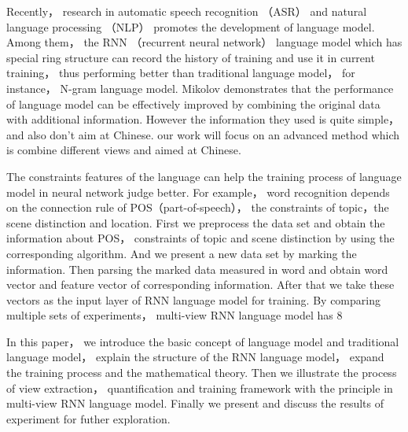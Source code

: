 \begin{englishabstract}
Recently， research in automatic speech recognition （ASR） and natural language processing （NLP） promotes the development of language model. Among them， the RNN （recurrent neural network） language model which has special ring structure can record the history of training and use it in current training， thus performing better than traditional language model， for instance， N-gram language model. Mikolov demonstrates that the performance of language model can be effectively improved by combining the original data with additional information. However the information they used is quite simple，and also don’t aim at Chinese. our work will focus on an advanced method which is combine different views and aimed at Chinese.

The constraints features of the language can help the training process of language model in neural network judge better. For example， word recognition depends on the connection rule of POS（part-of-speech）， the constraints of topic，the scene distinction and location. First we preprocess the data set and obtain the information about POS， constraints of topic and scene distinction by using the corresponding algorithm. And we present a new data set by marking the information. Then parsing the marked data measured in word and obtain word vector and feature vector of corresponding information. After that we take these vectors as the input layer of RNN language model for training. By comparing multiple sets of experiments， multi-view RNN language model has 8%

In this paper， we introduce the basic concept of language model and traditional  language model， explain the structure of the RNN language model， expand the training process and the mathematical theory. Then we illustrate the process of view extraction，  quantification and training framework with the principle in multi-view RNN language model. Finally we present and discuss the results of experiment for futher exploration.

\end{englishabstract}

